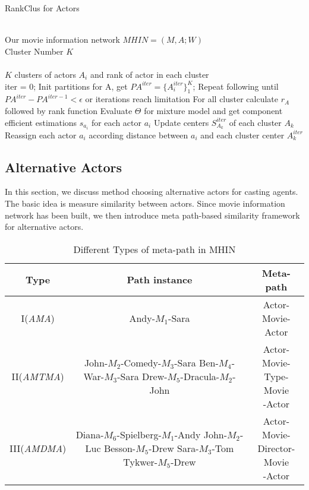 \begin{algorithm}[htb]
\renewcommand{\algorithmicrequire}{\textbf{Input:}}
\renewcommand\algorithmicensure {\textbf{Output:} }
\caption{RankClus for Actors}

\begin{algorithmic}[1]

\REQUIRE ~~\\
Our movie information network $MHIN=(M, A; W)$\\
Cluster Number $K$\\

\ENSURE ~~\\
$K$ clusters of actors $A_i$ and rank of actor in each cluster \\
\STATE iter = 0;
\STATE Init partitions for A, get $PA^{iter}=\{A_i^{iter}\}_1^K$;
\STATE Repeat following until $PA^{iter}-PA^{iter-1}<\epsilon$ or iterations reach limitation
\STATE \quad For all cluster calculate $r_A$ followed by rank function
\STATE \quad Evaluate $\Theta$ for mixture model and get component efficient estimations $s_{a_i}$ for each actor $a_i$
\STATE \quad Update centers $S_{A_k}^{iter}$ of each cluster $A_k$
\STATE \quad Reassign each actor $a_i$ according distance between $a_i$ and each cluster center $A_k^{iter}$
\end{algorithmic}
\end{algorithm}


\subsection{Alternative Actors}
In this section, we discuss method choosing alternative actors for casting agents. The basic idea is measure similarity between actors. Since movie information network has been built, we then introduce meta path-based similarity framework for alternative actors.

\begin{table}[!htb]
  \centering
  \begin{tabular}{c|c|c}
  \hline
  Type & Path instance & Meta-path \\
  \hline
  I(\emph{AMA})& Andy-$M_1$-Sara & \tabincell{c}{Actor-\\Movie-Actor}  \\
  \hline
  II(\emph{AMTMA}) & \tabincell{c}{John-$M_2$-Comedy-$M_3$-Sara\\Ben-$M_4$-War-$M_3$-Sara\\Drew-$M_5$-Dracula-$M_2$-John} & \tabincell{c}{Actor-Movie-\\Type-Movie\\-Actor} \\
  \hline
  III(\emph{AMDMA}) & \tabincell{c}{Diana-$M_6$-Spielberg-$M_1$-Andy\\John-$M_2$-Luc Besson-$M_5$-Drew\\Sara-$M_3$-Tom Tykwer-$M_5$-Drew} & \tabincell{c}{Actor-Movie-\\Director-Movie\\-Actor}\\
  \hline
  \end{tabular}
  \caption{Different Types of meta-path in MHIN}\label{tab:metapath}
\end{table}

